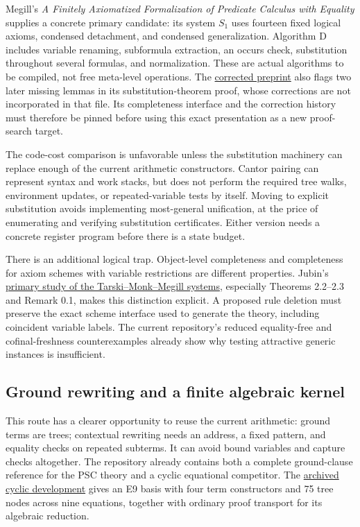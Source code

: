 Megill's \emph{A Finitely Axiomatized Formalization of Predicate Calculus
with Equality} supplies a concrete primary candidate: its system $S_1$
uses fourteen fixed logical axioms, condensed detachment, and condensed
generalization.  Algorithm D includes variable renaming, subformula
extraction, an occurs check, substitution throughout several formulas,
and normalization.  These are actual algorithms to be compiled, not free
meta-level operations.  The
\href{https://us.metamath.org/downloads/finiteaxiom.pdf}{corrected preprint}
also flags two later missing lemmas in its substitution-theorem proof,
whose corrections are not incorporated in that file.  Its completeness
interface and the correction history must therefore be pinned before
using this exact presentation as a new proof-search target.

The code-cost comparison is unfavorable unless the substitution machinery
can replace enough of the current arithmetic constructors.  Cantor pairing
can represent syntax and work stacks, but does not perform the required
tree walks, environment updates, or repeated-variable tests by itself.
Moving to explicit substitution avoids implementing most-general
unification, at the price of enumerating and verifying substitution
certificates.  Either version needs a concrete register program before
there is a state budget.

There is an additional logical trap.  Object-level completeness and
completeness for axiom schemes with variable restrictions are different
properties.  Jubin's
\href{https://arxiv.org/html/2202.10383}{primary study of the
Tarski--Monk--Megill systems}, especially Theorems 2.2--2.3 and
Remark 0.1, makes this distinction explicit.  A proposed rule deletion
must preserve the exact scheme interface used to generate the theory,
including coincident variable labels.  The current repository's reduced
equality-free and cofinal-freshness counterexamples already show why
testing attractive generic instances is insufficient.

\subsection{Ground rewriting and a finite algebraic kernel}

This route has a clearer opportunity to reuse the current arithmetic:
ground terms are trees; contextual rewriting needs an address, a fixed
pattern, and equality checks on repeated subterms.  It can avoid bound
variables and capture checks altogether.  The repository already contains
both a complete ground-clause reference for the PSC theory and a cyclic
equational competitor.  The
\href{https://github.com/VladimirReshetnikov/ProveIt/blob/8c41b1fb7d7bb8cd0612e37848181fe4a2f5d569/SetTheory/Cardinals/docs/reports/set-theory/zfc-closure-kernels/41-cyclic-notes-algebraic_development.md}
{archived cyclic development} gives an E9 basis with four term
constructors and 75 tree nodes across nine equations, together with
ordinary proof transport for its algebraic reduction.

